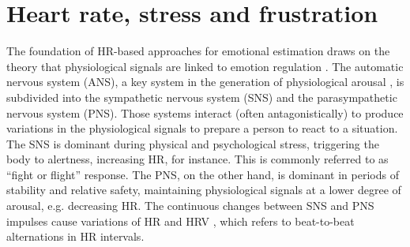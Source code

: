 
%
%
%

\section{Heart rate, stress and frustration}

The foundation of HR-based approaches for emotional estimation draws on the theory that physiological signals are linked to emotion regulation \parencite{appelhans2006heart,fenton2012emotion,schubert2009effects}. The automatic nervous system (ANS), a key system in the generation of physiological arousal \parencite{appelhans2006heart}, is subdivided into the sympathetic nervous system (SNS) and the parasympathetic nervous system (PNS). Those systems interact (often antagonistically) to produce variations in the physiological signals to prepare a person to react to a situation. The SNS is dominant during physical and psychological stress, triggering the body to alertness, increasing HR, for instance. This is commonly referred to as ``fight or flight'' response. The PNS, on the other hand, is dominant in periods of stability and relative safety, maintaining physiological signals at a lower degree of arousal, e.g. decreasing HR. The continuous changes between SNS and PNS impulses cause variations of HR and HRV \parencite{schubert2009effects}, which refers to beat-to-beat alternations in HR intervals.

